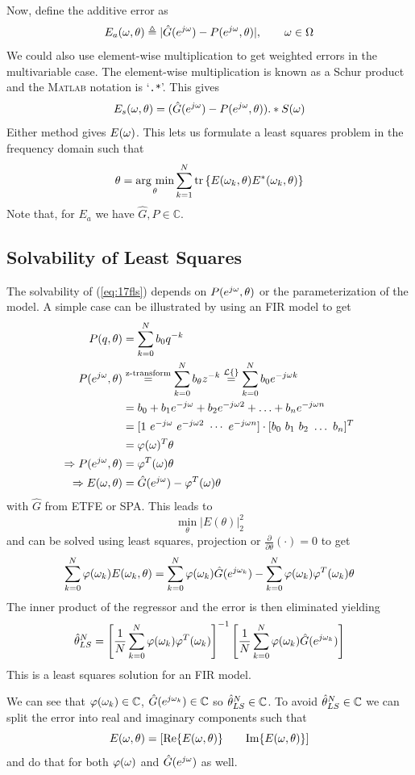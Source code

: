 Now, define the additive error as
$$E_a(\omega,\theta) \triangleq |\hat{G}(e^{j\omega})-P(e^{j\omega},\theta)|, \qquad \omega\in\Omega$$
We could also use element-wise multiplication to get weighted errors in the multivariable case. The element-wise multiplication is known as a Schur product and the \textsc{Matlab} notation is `\texttt{.*}'. This gives
$$E_s(\omega,\theta) = (\hat{G}(e^{j\omega})-P(e^{j\omega},\theta)).*S(\omega)$$
Either method gives $E(\omega)$. This lets us formulate a least squares problem in the frequency domain such that
\begin{align}
\label{eq:17fls}
\theta = \mathop{\arg\,\min}\limits_\theta\sum_{k=1}^N\text{tr}\left\lbrace E(\omega_k,\theta)E^\ast(\omega_k,\theta)\right\rbrace
\end{align}
Note that, for $E_a$ we have $\hat{G},P\in\mathbb{C}$.

\subsection{Solvability of Least Squares}
The solvability of (\ref{eq:17fls}) depends on $P(e^{j\omega},\theta)$ or the parameterization of the model. A simple case can be illustrated by using an FIR model to get
\begin{align*}
P(q,\theta) &= \sum_{k=0}^N b_0q^{-k} \\
P(e^{j\omega},\theta) &\stackrel{\text{z-transform}}{=} \sum_{k=0}^N b_\theta z^{-k} \stackrel{\mathcal{L}\{\}}{=} \sum_{k=0}^N b_0e^{-j\omega k} \\
&= b_0 + b_1e^{-j\omega} + b_2e^{-j\omega 2} + \ldots + b_ne^{-j\omega n} \\
&= [1 ~ e^{-j\omega} ~ e^{-j\omega 2} ~ \cdots ~ e^{-j\omega n}] \cdot [b_0 ~ b_1 ~ b_2 ~ \ldots ~ b_n]^T \\
&= \varphi(\omega)^T\theta \\
\Rightarrow P(e^{j\omega},\theta) &= \varphi^T(\omega)\theta \\
\Rightarrow E(\omega,\theta) &= \hat{G}(e^{j\omega})-\varphi^T(\omega)\theta
\end{align*}
with $\hat{G}$ from ETFE or SPA. This leads to
$$\min_\theta|E(\theta)|_2^2$$
and can be solved using least squares, projection or $\tfrac{\partial}{\partial\theta}(\cdot)=0$ to get
$$\sum_{k=0}^N\varphi(\omega_k)E(\omega_k,\theta) = \sum_{k=0}^N\varphi(\omega_k)\hat{G}(e^{j\omega_k}) - \sum_{k=0}^N\varphi(\omega_k)\varphi^T(\omega_k)\theta$$
The inner product of the regressor and the error is then eliminated yielding
$$\hat{\theta}_{LS}^N = \left[\frac{1}{N}\sum_{k=0}^N\varphi(\omega_k)\varphi^T(\omega_k)\right]^{-1}\left[\frac{1}{N}\sum_{k=0}^N\varphi(\omega_k)\hat{G}(e^{j\omega_k})\right]$$
This is a least squares solution for an FIR model.

We can see that $\varphi(\omega_k)\in\mathbb{C}$, $\hat{G}(e^{j\omega_k})\in\mathbb{C}$ so $\hat{\theta}_{LS}^N\in\mathbb{C}$. To avoid $\hat{\theta}_{LS}^N\in\mathbb{C}$ we can split the error into real and imaginary components such that
$$E(\omega,\theta) = \left[\text{Re}\{E(\omega,\theta)\} \qquad \text{Im}\{E(\omega,\theta)\}\right]$$
and do that for both $\varphi(\omega)$ and $\hat{G}(e^{j\omega})$ as well.

